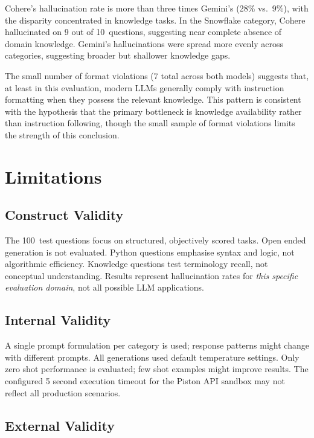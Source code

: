 \documentclass[12pt,a4paper]{article}
\begin{document}
Cohere's hallucination rate is more than three times Gemini's (28\% vs.\ 9\%), with the disparity concentrated in knowledge tasks. In the Snowflake category, Cohere hallucinated on 9 out of 10~questions, suggesting near complete absence of domain knowledge. Gemini's hallucinations were spread more evenly across categories, suggesting broader but shallower knowledge gaps.

The small number of format violations (7 total across both models) suggests that, at least in this evaluation, modern LLMs generally comply with instruction formatting when they possess the relevant knowledge. This pattern is consistent with the hypothesis that the primary bottleneck is knowledge availability rather than instruction following, though the small sample of format violations limits the strength of this conclusion.

\section{Limitations}

\subsection{Construct Validity}

The 100~test questions focus on structured, objectively scored tasks. Open ended generation is not evaluated. Python questions emphasise syntax and logic, not algorithmic efficiency. Knowledge questions test terminology recall, not conceptual understanding. Results represent hallucination rates for \emph{this specific evaluation domain}, not all possible LLM applications.

\subsection{Internal Validity}

A single prompt formulation per category is used; response patterns might change with different prompts. All generations used default temperature settings. Only zero shot performance is evaluated; few shot examples might improve results. The configured 5 second execution timeout for the Piston API sandbox may not reflect all production scenarios.

\subsection{External Validity}
\end{document}
